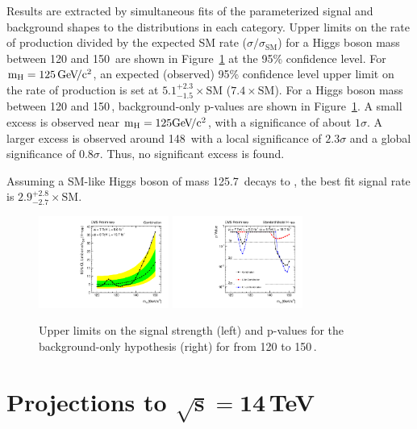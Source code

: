 \documentclass[10pt]{article}
\begin{document}
Results are extracted by simultaneous fits of the parameterized signal and background shapes
to the \Mmumu{} distributions in each category.  Upper limits
on the rate of \hmm{} production divided by the expected SM \hmm{} rate ($\sigma/\sigma_\mathrm{SM}$) 
for a Higgs boson mass between 120 and 150\,\GeVcc{} are shown in Figure~\ref{fig:results} at 
the 95\% confidence level.  
For $\mathrm{m_H}{}=125\,\mathrm{Ge\kern -0.1em V\!/c^2}{}$, an expected (observed) 95\% confidence level upper limit
on the rate of \hmm{} production is set at 
$5.1^{+2.3}_{-1.5}\times\mathrm{SM}$ ($7.4\times\mathrm{SM}$).
For a Higgs boson mass between 120 and 150\,\GeVcc{}, background-only p-values are shown
in Figure~\ref{fig:results}.  A small excess is observed near $\mathrm{m_H}{}=125\mathrm{Ge\kern -0.1em V\!/c^2}{}$, with
a significance of about $1\sigma$.  A larger excess is observed around 148\,\GeVcc{}
with a local significance of $2.3\sigma$ and a global significance
of $0.8\sigma$.  Thus, no significant excess is found.

Assuming a SM-like Higgs boson of mass 125.7\,\GeVcc{} decays to \mm{},
the best fit signal rate is $2.9^{+2.8}_{-2.7}\times\mathrm{SM}$.

\begin{figure}[htb]
\centering
\includegraphics[width=0.38\textwidth]{plotsPublic/limits_annalysisA/pdf/CombSplitAll_7P8TeV.pdf}
\includegraphics[width=0.38\textwidth]{plotsPublic/pValues_analysisA/pdf/pValues_Final7P8TeV.pdf}
\caption{ Upper limits on the signal strength (left) and p-values for the 
            background-only hypothesis (right) for \mh{} from 120 to 150\,\GeVcc{}.}
\label{fig:results}
\end{figure}

\section{Projections to $\mathbf{\sqrt{s}=14}$\,TeV}
\end{document}
